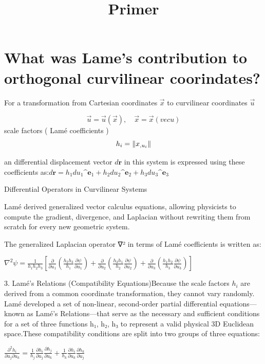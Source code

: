 \documentclass[11pt,a4paper,draft]{amsart}
\begin{document}
\title{Primer}

\section{What was Lame's contribution to orthogonal curvilinear coorindates?}

For a transformation from Cartesian coordinates
\(\vec{x}\)
to curvilinear coordinates
\(\vec{u}\)

\[
\vec{u} = \vec{u}(\vec{x}), \quad  \vec{x} = \vec{x}(vec{u})
\]
scale factors ( Lamé coefficients )
\[
 h_{i} = \left\lVert  x_{, u_i} \right\rVert
\]

an differential displacement vector \(d\mathbf{r}\) in this system is expressed using these coefficients as:\(d\mathbf{r}=h_{1}du_{1}\^{\mathbf{e}}_{1}+h_{2}du_{2}\^{\mathbf{e}}_{2}+h_{3}du_{3}\^{\mathbf{e}}_{3}\)



Differential Operators in Curvilinear Systems


Lamé derived generalized vector calculus equations, allowing physicists to compute the gradient, divergence, and Laplacian without rewriting them from scratch for every new geometric system.

The generalized Laplacian operator ∇² in terms of Lamé coefficients is written as:

\(\nabla ^{2}\psi =\frac{1}{h_{1}h_{2}h_{3}}\left[\frac{\partial }{\partial u_{1}}\left(\frac{h_{2}h_{3}}{h_{1}}\frac{\partial \psi }{\partial u_{1}}\right)+\frac{\partial }{\partial u_{2}}\left(\frac{h_{3}h_{1}}{h_{2}}\frac{\partial \psi }{\partial u_{2}}\right)+\frac{\partial }{\partial u_{3}}\left(\frac{h_{1}h_{2}}{h_{3}}\frac{\partial \psi }{\partial u_{3}}\right)\right]\)


3. Lamé's Relations (Compatibility Equations)Because the scale factors \(h_{i}\)
are derived from a common coordinate transformation, they cannot vary randomly. Lamé developed a set of non-linear, second-order partial differential equations—known as Lamé's Relations—that serve as the necessary and sufficient conditions for a set of three functions h₁, h₂, h₃ to represent a valid physical 3D Euclidean space.These compatibility conditions are split into two groups of three equations:

\(\frac{\partial ^{2}h_{i}}{\partial u_{j}\partial u_{k}}=\frac{1}{h_{j}}\frac{\partial h_{i}}{\partial u_{j}}\frac{\partial h_{j}}{\partial u_{k}}+\frac{1}{h_{k}}\frac{\partial h_{i}}{\partial u_{k}}\frac{\partial h_{k}}{\partial u_{j}}\)
\end{document}
